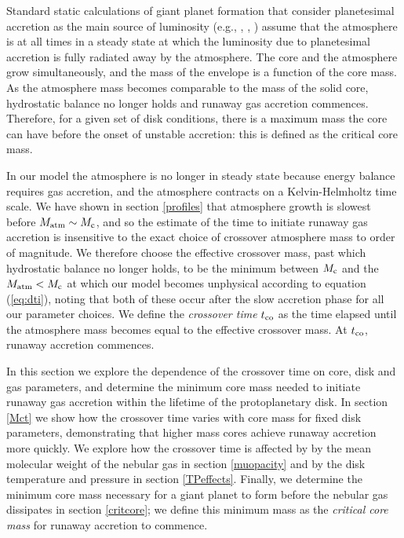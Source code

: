 \documentclass[apj]{emulateapj}
\begin{document}
Standard static calculations of giant planet formation that consider planetesimal accretion as the main source of luminosity (e.g., \citealt{mizuno78}, \citealt{stevenson82}, \citealt{rafikov06}) assume that the atmosphere is at all times in a steady state at which the luminosity due to planetesimal accretion is fully radiated away by the atmosphere. The core and the atmosphere grow simultaneously, and the mass of the envelope is a function of the core mass. As the atmosphere mass becomes comparable to the mass of the solid core, hydrostatic balance no longer holds and runaway gas accretion commences. Therefore, for a given set of disk conditions, there is a maximum mass the core can have before the onset of unstable accretion: this is defined as the critical core mass. %

In our model the atmosphere is no longer in steady state because energy balance requires gas accretion, and the atmosphere contracts on a Kelvin-Helmholtz time scale. We have shown in section \ref{profiles} that atmosphere growth is slowest before $M_{\rm{atm}} \sim M_{\rm c}$, and so the estimate of the time to initiate runaway gas accretion is insensitive to the exact choice of crossover atmosphere mass to order of magnitude. We therefore choose the effective crossover mass, past which hydrostatic balance no longer holds, to be the minimum between $M_{\rm{c}}$ and the $M_{\rm{atm}}<M_{\rm c}$ at which our model becomes unphysical according to equation (\ref{eq:dti}), noting that both of these occur after the slow accretion phase for all our parameter choices. We define the \textit{crossover time} $t_{\rm{co}}$ as the time elapsed until the atmosphere mass becomes equal to the effective crossover mass. At $t_{\rm{co}}$, runaway accretion commences.

In this section we explore the dependence of the crossover time on core, disk and gas parameters, and determine the minimum core mass needed to initiate runaway gas accretion within the lifetime of the protoplanetary disk. In section \ref{Mct} we show how the crossover time varies with core mass for fixed disk parameters, demonstrating that higher mass cores achieve runaway accretion more quickly. We explore how the crossover time is affected by by the mean molecular weight of the nebular gas in section \ref{muopacity} and by the disk temperature and pressure in section \ref{TPeffects}. Finally, we determine the minimum core mass necessary for a giant planet to form before the nebular gas dissipates in section \ref{critcore}; we define this minimum mass as the \textit{critical core mass} for runaway accretion to commence. 
\end{document}
